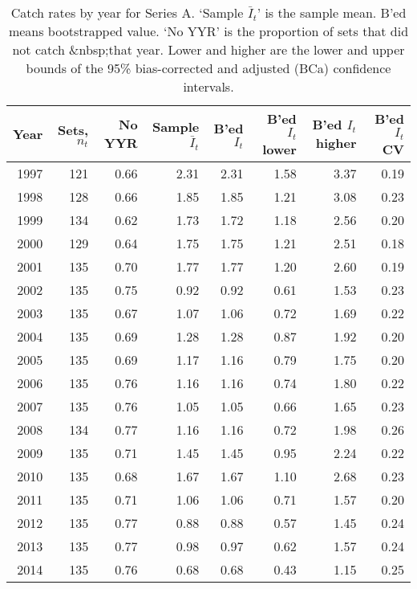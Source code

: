 \begin{table}[tp]
\centering
\caption{Catch rates by year for Series A.
     `Sample $\bar{I}_t$' is the sample mean. B'ed means bootstrapped 
     value. `No YYR' is the proportion of sets that did not catch \spName&nbsp;that
     year. Lower and higher are the 
     lower and upper bounds of the 95\% bias-corrected and adjusted (BCa)
     confidence intervals.} 
\label{tab:bcaKeepSerA}
\begin{tabular}{rrrrrrrr}
  \hline
Year & Sets, $n_t$ & No YYR & Sample $\bar{I}_t$ & B'ed $I_t$ & B'ed $I_t$ lower & B'ed $I_t$ higher & B'ed $I_t$ CV \\ 
  \hline
1997 & 121 & 0.66 & 2.31 & 2.31 & 1.58 & 3.37 & 0.19 \\ 
  1998 & 128 & 0.66 & 1.85 & 1.85 & 1.21 & 3.08 & 0.23 \\ 
  1999 & 134 & 0.62 & 1.73 & 1.72 & 1.18 & 2.56 & 0.20 \\ 
  2000 & 129 & 0.64 & 1.75 & 1.75 & 1.21 & 2.51 & 0.18 \\ 
  2001 & 135 & 0.70 & 1.77 & 1.77 & 1.20 & 2.60 & 0.19 \\ 
  2002 & 135 & 0.75 & 0.92 & 0.92 & 0.61 & 1.53 & 0.23 \\ 
  2003 & 135 & 0.67 & 1.07 & 1.06 & 0.72 & 1.69 & 0.22 \\ 
  2004 & 135 & 0.69 & 1.28 & 1.28 & 0.87 & 1.92 & 0.20 \\ 
  2005 & 135 & 0.69 & 1.17 & 1.16 & 0.79 & 1.75 & 0.20 \\ 
  2006 & 135 & 0.76 & 1.16 & 1.16 & 0.74 & 1.80 & 0.22 \\ 
  2007 & 135 & 0.76 & 1.05 & 1.05 & 0.66 & 1.65 & 0.23 \\ 
  2008 & 134 & 0.77 & 1.16 & 1.16 & 0.72 & 1.98 & 0.26 \\ 
  2009 & 135 & 0.71 & 1.45 & 1.45 & 0.95 & 2.24 & 0.22 \\ 
  2010 & 135 & 0.68 & 1.67 & 1.67 & 1.10 & 2.68 & 0.23 \\ 
  2011 & 135 & 0.71 & 1.06 & 1.06 & 0.71 & 1.57 & 0.20 \\ 
  2012 & 135 & 0.77 & 0.88 & 0.88 & 0.57 & 1.45 & 0.24 \\ 
  2013 & 135 & 0.77 & 0.98 & 0.97 & 0.62 & 1.57 & 0.24 \\ 
  2014 & 135 & 0.76 & 0.68 & 0.68 & 0.43 & 1.15 & 0.25 \\ 
   \hline
\end{tabular}
\end{table}%
